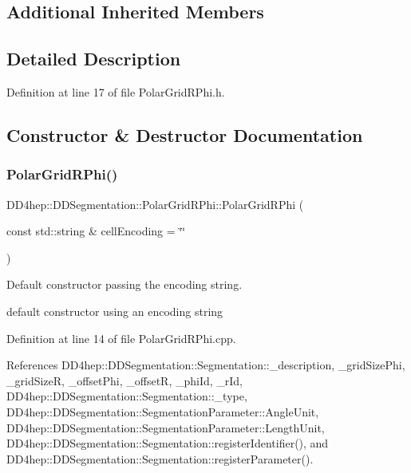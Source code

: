 \subsection*{Additional Inherited Members}


\subsection{Detailed Description}


Definition at line 17 of file Polar\+Grid\+R\+Phi.\+h.



\subsection{Constructor \& Destructor Documentation}
\hypertarget{class_d_d4hep_1_1_d_d_segmentation_1_1_polar_grid_r_phi_a1894c699445be28e281dc8e292c70efb}{}\label{class_d_d4hep_1_1_d_d_segmentation_1_1_polar_grid_r_phi_a1894c699445be28e281dc8e292c70efb} 
\subsubsection{\texorpdfstring{Polar\+Grid\+R\+Phi()}{PolarGridRPhi()}\hspace{0.1cm}{\footnotesize\ttfamily [1/2]}}
{\footnotesize\ttfamily D\+D4hep\+::\+D\+D\+Segmentation\+::\+Polar\+Grid\+R\+Phi\+::\+Polar\+Grid\+R\+Phi (\begin{DoxyParamCaption}\item[{const std\+::string \&}]{cell\+Encoding = {\ttfamily \char`\"{}\char`\"{}} }\end{DoxyParamCaption})}



Default constructor passing the encoding string. 

default constructor using an encoding string 

Definition at line 14 of file Polar\+Grid\+R\+Phi.\+cpp.



References D\+D4hep\+::\+D\+D\+Segmentation\+::\+Segmentation\+::\+\_\+description, \+\_\+grid\+Size\+Phi, \+\_\+grid\+SizeR, \+\_\+offset\+Phi, \+\_\+offsetR, \+\_\+phi\+Id, \+\_\+r\+Id, D\+D4hep\+::\+D\+D\+Segmentation\+::\+Segmentation\+::\+\_\+type, D\+D4hep\+::\+D\+D\+Segmentation\+::\+Segmentation\+Parameter\+::\+Angle\+Unit, D\+D4hep\+::\+D\+D\+Segmentation\+::\+Segmentation\+Parameter\+::\+Length\+Unit, D\+D4hep\+::\+D\+D\+Segmentation\+::\+Segmentation\+::register\+Identifier(), and D\+D4hep\+::\+D\+D\+Segmentation\+::\+Segmentation\+::register\+Parameter().

